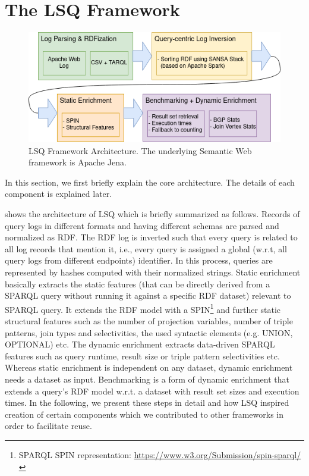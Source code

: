 \section{The LSQ Framework}
\begin{figure}
\includegraphics[width=\textwidth]{images/lsq2-architecture-new}
\caption{LSQ Framework Architecture. The underlying Semantic Web framework is Apache Jena.}
\label{fig:architecture}
\end{figure}
In this section, we first briefly explain the core architecture. The details of each component is explained later. 

 shows the architecture of LSQ which is briefly summarized as follows.
Records of query logs in different formats and having different schemas are parsed and normalized as RDF. 
The RDF log is inverted such that every query is related to all log records that mention it, i.e., every query is assigned a global (w.r.t, all query logs from different endpoints) identifier. 
In this process, queries are represented by hashes computed with their normalized strings. Static enrichment basically extracts the static features (that can be directly derived from a SPARQL query without running it against a specific RDF dataset) relevant to SPARQL query. It extends the RDF model with a SPIN\footnote{SPARQL SPIN representation: \url{https://www.w3.org/Submission/spin-sparql/}} and further static structural features such as the number of projection variables, number of triple patterns, join types and selectivities, the used syntactic elements (e.g. UNION, OPTIONAL) etc. %
The dynamic enrichment extracts data-driven SPARQL features such as query runtime, result size or triple pattern selectivities etc.  Whereas static enrichment is independent on any dataset, dynamic enrichment needs a dataset as input. Benchmarking is a form of dynamic enrichment that extends a query's RDF model w.r.t. a dataset with result set sizes and execution times.
In the following, we present these steps in detail and how
LSQ inspired creation of certain components which we contributed to other frameworks in order to facilitate reuse.



